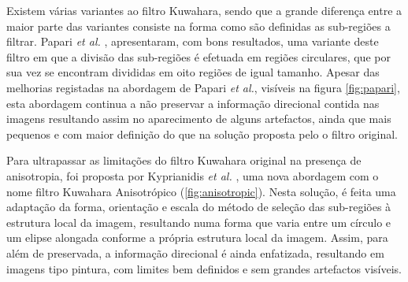 Existem várias variantes ao filtro Kuwahara, sendo que a grande diferença entre a maior parte das variantes consiste na forma como são definidas as sub-regiões a filtrar. Papari \textit{et al.} \cite{Papari2007}, apresentaram, com bons resultados, uma variante deste filtro em que a divisão das sub-regiões é efetuada em regiões circulares, que por sua vez se encontram divididas em oito regiões de igual tamanho. Apesar das melhorias registadas na abordagem de Papari \textit{et al.}, visíveis na figura \ref{fig:papari}, esta abordagem continua a não preservar a informação direcional contida nas imagens resultando assim no aparecimento de alguns artefactos, ainda que mais pequenos e com maior definição do que na solução proposta pelo o filtro original.

Para ultrapassar as limitações do filtro Kuwahara original na presença de anisotropia, foi proposta por Kyprianidis \textit{et al.} \cite{Kyprianidis2009}, uma nova abordagem com o nome filtro Kuwahara Anisotrópico (\ref{fig:anisotropic}). Nesta solução, é feita uma adaptação da forma, orientação e escala do método de seleção das sub-regiões à estrutura local da imagem, resultando numa forma que varia entre um círculo e um elipse alongada conforme a própria estrutura local da imagem. Assim, para além de preservada, a informação direcional é ainda enfatizada, resultando em imagens tipo pintura, com limites bem definidos e sem grandes artefactos visíveis.

